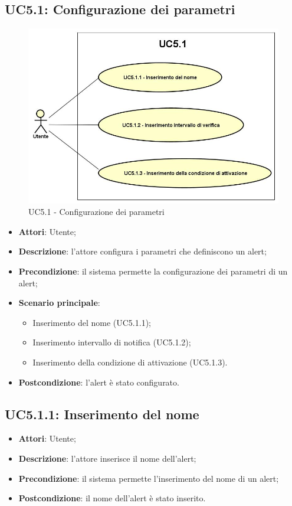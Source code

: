 \subsection{UC5.1: Configurazione dei parametri}
\hypertarget{UC5.1}{}
\begin{figure} [H]
	\centering
	\includegraphics[scale=0.45]{Img/UC5-1}
	\caption{UC5.1 - Configurazione dei parametri}\label{}
\end{figure}
\begin{itemize}
	\item \textbf{Attori}: Utente;
	\item \textbf{Descrizione}: l'attore configura i parametri che definiscono un alert;
	\item \textbf{Precondizione}: il sistema permette la configurazione dei parametri di un alert;
	\item \textbf{Scenario principale}:
	\begin{itemize}
		\item Inserimento del nome (UC5.1.1);
		\item Inserimento intervallo di notifica (UC5.1.2);
		\item Inserimento della condizione di attivazione (UC5.1.3).
	\end{itemize}
	\item \textbf{Postcondizione}: l'alert è stato configurato.
\end{itemize}

\subsection{UC5.1.1: Inserimento del nome}
\hypertarget{UC5.1.1}{}
\begin{itemize}
	\item \textbf{Attori}: Utente;
	\item \textbf{Descrizione}: l'attore inserisce il nome dell'alert;
	\item \textbf{Precondizione}: il sistema permette l'inserimento del nome di un alert;
	\item \textbf{Postcondizione}: il nome dell'alert è stato inserito.
\end{itemize}

